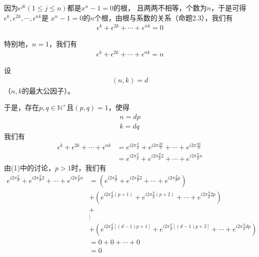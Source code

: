 \documentclass{article}
\begin{document}
因为$\epsilon^{jk} (1 \leq j \leq n)$都是$x^n - 1 = 0$的根，
且两两不相等，个数为$n$，于是可得$\epsilon^{k}, \epsilon^{2k}, \cdots, \epsilon^{nk}$是
$x^n - 1 = 0$的$n$个根，由根与系数的关系（命题2.3），我们有
\begin{align*}
  \epsilon^{k} + \epsilon^{2k} + \cdots + \epsilon^{nk} = 0
\end{align*}

特别地，$n = 1$，我们有
\begin{align*}
  \epsilon^k + \epsilon^{2k} + \cdots + \epsilon^{nk} = n
\end{align*}

设
\begin{align*}
  (n, k) = d
\end{align*}
（$n, k$的最大公因子）。

于是，存在$p, q \in \mathbb{N}^+$且$(p,q) = 1$，使得
\begin{align*}
  n = dp \\
  k = dq
\end{align*}
我们有
\begin{align*}
  \epsilon^k + \epsilon^{2k} + \cdots + \epsilon^{nk}
   & = e^{i 2\pi \frac{k}{n}} + e^{i 2\pi \frac{2k}{n}} + \cdots + e^{i 2\pi \frac{nk}{n}}  \\
   & = e^{i 2\pi \frac{q}{p}} + e^{i 2\pi \frac{q}{p} 2} + \cdots + e^{i 2\pi \frac{q}{p}n}
\end{align*}
由(1)中的讨论，$p > 1$时，我们有
\begin{align*}
  e^{i 2\pi \frac{q}{p}} + e^{i 2\pi \frac{q}{p} 2} + \cdots + e^{i 2\pi \frac{q}{p}n}
   & = (e^{i 2\pi \frac{q}{p}} + e^{i 2\pi \frac{q}{p} 2} + \cdots + e^{i 2\pi \frac{q}{p}p})                    \\
   & +
  (e^{i 2\pi \frac{q}{p}(p+1)} + e^{i 2\pi \frac{q}{p} (p+2)} + \cdots + e^{i 2\pi \frac{q}{p}2p})               \\
   & +                                                                                                           \\
   & \vdots                                                                                                      \\
   & +
  (e^{i 2\pi \frac{q}{p}[(d-1)p + 1]} + e^{i 2\pi \frac{q}{p} [(d-1)p + 2]} + \cdots + e^{i 2\pi \frac{q}{p}dp}) \\
   & = 0 + 0 + \cdots + 0                                                                                        \\
   & = 0
\end{align*}
\end{document}
